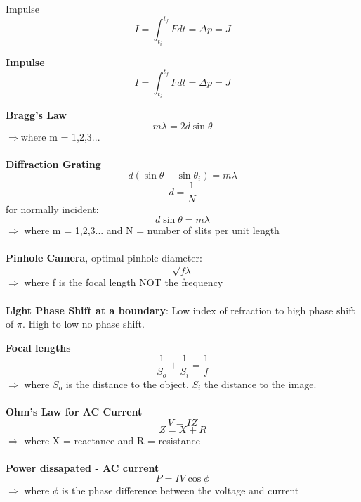 \documentclass{article}
\begin{document}
{Impulse\begin{equation}I = \int_{t_i}^{t_f} Fdt = \Delta p = J \end{equation}

{\bf{Impulse}}\begin{equation}I = \int_{t_i}^{t_f} Fdt = \Delta p = J \end{equation}

{\bf{Bragg's Law}}\begin{equation} m\lambda = 2d\sin{\theta}\end{equation}
$\Rightarrow$where m = 1,2,3...\\
\\
{\bf{Diffraction Grating}}\begin{equation}d(\sin{\theta}-\sin{\theta_i}) = m\lambda \end{equation}
\begin{equation}d = \frac{1}{N}\end{equation}
\hspace*{.5in}for normally incident:
\begin{equation}d\sin{\theta} = m\lambda\end{equation}
$\Rightarrow$ where m = 1,2,3... and N = number of slits per unit length\\
\\
{\bf{Pinhole Camera}}, optimal pinhole diameter:\begin{equation}\sqrt{f\lambda}\end{equation}
$\Rightarrow$ where f is the focal length NOT the frequency\\
\\
{\bf{Light Phase Shift at a boundary}}: Low index of refraction to high phase shift of $\pi$.  High to low no phase shift.

{\bf{Focal lengths}}\begin{equation}\frac{1}{S_o}+\frac{1}{S_i} = \frac{1}{f}\end{equation}
$\Rightarrow$ where $S_o$ is the distance to the object, $S_i$ the distance to the image.\\
\\
{\bf{Ohm's Law for AC Current}}\begin{equation}V = IZ\end{equation}
\begin{equation}Z = X + R\end{equation}
$\Rightarrow$ where X = reactance and R = resistance\\
\\
{\bf{Power dissapated - AC current}}\begin{equation}P = IV\cos{\phi}\end{equation}
$\Rightarrow$ where $\phi$ is the phase difference between the voltage and current 




}
\end{document}
